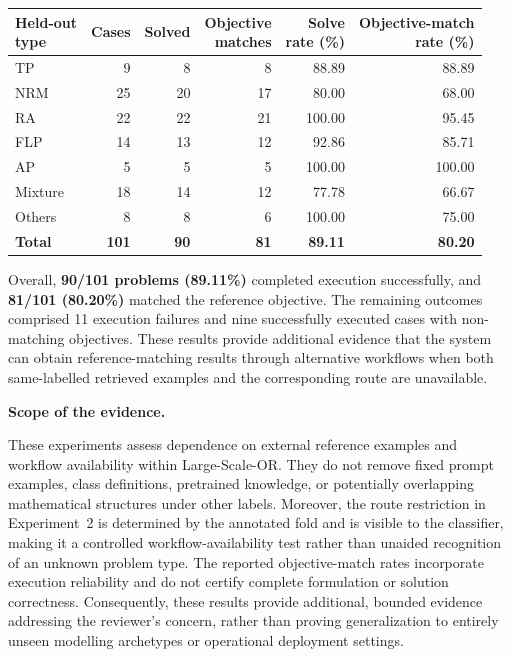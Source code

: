 \documentclass[11pt]{article}
\begin{document}
\begin{enumerate}[label=(R1.Major.\arabic*),leftmargin=*]
\begin{center}
\small
\setlength{\tabcolsep}{5pt}
\renewcommand{\arraystretch}{1.12}
\begin{tabular}{lrrrrr}
\hline
\shortstack[l]{Held-out\\type}
& Cases
& Solved
& \shortstack{Objective\\matches}
& \shortstack{Solve\\rate (\%)}
& \shortstack{Objective-match\\rate (\%)} \\
\hline
TP      & 9  & 8  & 8  & 88.89  & 88.89 \\
NRM     & 25 & 20 & 17 & 80.00  & 68.00 \\
RA      & 22 & 22 & 21 & 100.00 & 95.45 \\
FLP     & 14 & 13 & 12 & 92.86  & 85.71 \\
AP      & 5  & 5  & 5  & 100.00 & 100.00 \\
Mixture & 18 & 14 & 12 & 77.78  & 66.67 \\
Others  & 8  & 8  & 6  & 100.00 & 75.00 \\
\hline
\textbf{Total}
& \textbf{101}
& \textbf{90}
& \textbf{81}
& \textbf{89.11}
& \textbf{80.20} \\
\hline
\end{tabular}
\end{center}

Overall, \textbf{90/101 problems (89.11\%)} completed execution successfully, and \textbf{81/101 (80.20\%)} matched the reference objective. The remaining outcomes comprised 11 execution failures and nine successfully executed cases with non-matching objectives. These results provide additional evidence that the system can obtain reference-matching results through alternative workflows when both same-labelled retrieved examples and the corresponding route are unavailable.

\medskip
\noindent\textbf{Scope of the evidence.}

These experiments assess dependence on external reference examples and workflow availability within Large-Scale-OR. They do not remove fixed prompt examples, class definitions, pretrained knowledge, or potentially overlapping mathematical structures under other labels. Moreover, the route restriction in Experiment~2 is determined by the annotated fold and is visible to the classifier, making it a controlled workflow-availability test rather than unaided recognition of an unknown problem type. The reported objective-match rates incorporate execution reliability and do not certify complete formulation or solution correctness. Consequently, these results provide additional, bounded evidence addressing the reviewer's concern, rather than proving generalization to entirely unseen modelling archetypes or operational deployment settings.



\end{enumerate}
\end{document}

